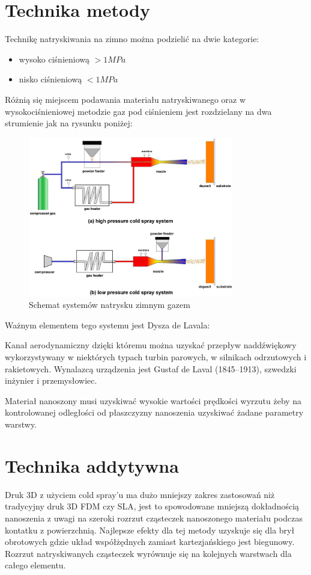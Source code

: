 \documentclass[13pt]{article}
\begin{document}
\section{Technika metody}
Technikę natryskiwania na zimno można podzielić na dwie kategorie:
\begin{itemize}
\item wysoko ciśnieniową $>1MPa$
\item nisko ciśnieniową $<1MPa$
\end{itemize}
Różnią się miejscem podawania materiału natryskiwanego oraz w wysokociśnieniowej metodzie gaz pod ciśnieniem jest rozdzielany na dwa strumienie jak na rysunku poniżej:

\begin{figure}[!h]
	\centering
	\includegraphics[width=0.8\textwidth]{sys.jpg}
	\caption{ Schemat systemów natrysku zimnym gazem \cite{additive}}
\end{figure}

Ważnym elementem tego systemu jest Dysza de Lavala:
\begin{definition}
Kanał aerodynamiczny dzięki któremu można uzyskać przepływ naddźwiękowy wykorzystywany w niektórych typach turbin parowych, w silnikach odrzutowych i rakietowych. Wynalazcą urządzenia jest Gustaf de Laval (1845–1913), szwedzki inżynier i przemysłowiec. \cite{wikil}
\end{definition}

Materiał nanoszony musi uzyskiwać wysokie wartości prędkości wyrzutu żeby na kontrolowanej odległości od płaszczyzny nanoszenia uzyskiwać żadane parametry warstwy.

\newpage

\section{Technika addytywna}
Druk 3D z użyciem cold spray'u ma dużo mniejszy zakres zastosowań niż tradycyjny druk 3D FDM czy SLA, jest to spowodowane mniejszą dokładnością nanoszenia z uwagi na szeroki rozrzut cząsteczek nanoszonego materiału podczas kontatku z powierzchnią. Najlepsze efekty dla tej metody uzyskuje się dla brył obrotowych gdzie układ współżędnych zamiast kartezjańskiego jest biegunowy. Rozrzut natryskiwanych cząsteczek wyrównuje się na kolejnych warstwach dla całego elementu.
\end{document}
